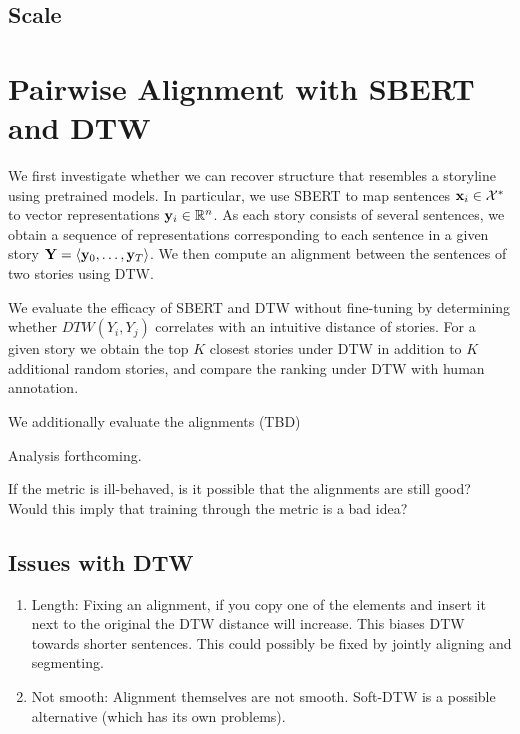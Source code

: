 \documentclass{article}
\begin{document}
\begin{comment}
Additionally,
if a parameterized distance measure (with associated representations)
is correlated with human judgements for stories,
then it may be possible to engineer an unsupervised objective that allows
training of the parameterized distance to further improve performance.
This approach to analysis allows us to initially avoid expensive
likelihood-based methods that reconstruct full stories.
\end{comment}

\subsection{Scale}

\section{Pairwise Alignment with SBERT and DTW}
\label{pairwise}
We first investigate whether we can recover structure that resembles a storyline
using pretrained models.
In particular, we use SBERT \citep{reimers2019sbert}
to map sentences $\mathbf{x}_i \in \mathcal{X}^*$ to vector representations $\mathbf{y}_i \in \mathbb{R}^n$.
As each story consists of several sentences, we obtain a sequence of representations
corresponding to each sentence in a given story $\mathbf{Y} = \langle \mathbf{y}_0, \ldots, \mathbf{y}_T \rangle$.
We then compute an alignment between the sentences of two stories using DTW.

We evaluate the efficacy of SBERT and DTW without fine-tuning by determining whether
$DTW(Y_i, Y_j)$ correlates with an intuitive distance of stories.
For a given story we obtain the top $K$ closest stories under DTW
in addition to $K$ additional random stories,
and compare the ranking under DTW with human annotation.

We additionally evaluate the alignments (TBD)

Analysis forthcoming.

If the metric is ill-behaved, is it possible that the alignments are still good?
Would this imply that training through the metric is a bad idea?

\subsection{Issues with DTW}
\begin{enumerate}
\item Length: Fixing an alignment, if you copy one of the elements and insert it
    next to the original the DTW distance will increase.
    This biases DTW towards shorter sentences.
    This could possibly be fixed by jointly aligning and segmenting.
\item Not smooth: Alignment themselves are not smooth. Soft-DTW is a possible
    alternative (which has its own problems).
\end{enumerate}
\end{document}
